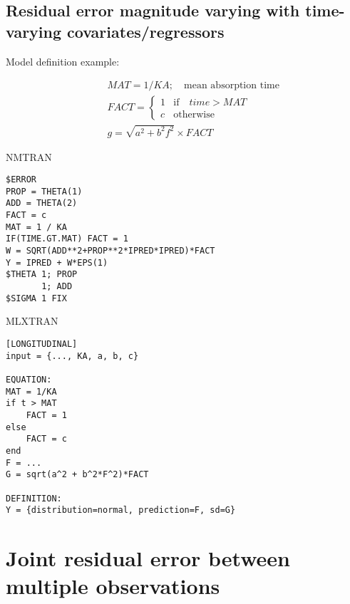 \subsection{Residual error magnitude varying with time-varying covariates/regressors}
\label{otherModels_model5}

Model definition example:

\begin{eqnarray}
&&MAT = 1/KA; \quad \text{mean absorption time} \nonumber \\
&&FACT = \left\{ \begin{array}{rcl}  1 & \mbox{if} \quad time > MAT \\
c & \mbox{otherwise}   
\end{array}\right. \nonumber \\
&&g = \sqrt{a^2 + b^2 f^2} \times FACT \nonumber
\end{eqnarray}

\bigskip
\begin{lrbox}{\lstbox}\begin{minipage}{16cm}
NMTRAN
\begin{lstlisting}[frame=single,language=NM]
$ERROR
PROP = THETA(1)
ADD = THETA(2)
FACT = c
MAT = 1 / KA 
IF(TIME.GT.MAT) FACT = 1
W = SQRT(ADD**2+PROP**2*IPRED*IPRED)*FACT
Y = IPRED + W*EPS(1)
$THETA 1; PROP
	   1; ADD
$SIGMA 1 FIX
\end{lstlisting}   
\end{minipage}\end{lrbox}
\usebox\lstbox


\begin{lrbox}{\lstbox}\begin{minipage}{16cm}
MLXTRAN
\begin{lstlisting}[frame=single,language=MLX]
[LONGITUDINAL]
input = {..., KA, a, b, c}

EQUATION:
MAT = 1/KA
if t > MAT
	FACT = 1
else
	FACT = c
end
F = ...
G = sqrt(a^2 + b^2*F^2)*FACT

DEFINITION:
Y = {distribution=normal, prediction=F, sd=G}
\end{lstlisting}   
\end{minipage}\end{lrbox}
\usebox\lstbox


\section{Joint residual error between multiple observations}
\label{otherModels_model2}


